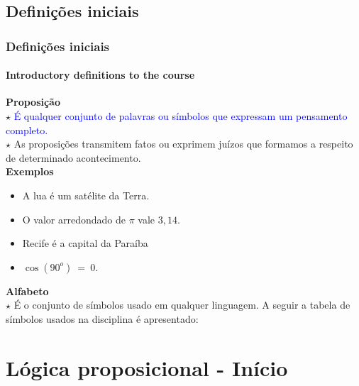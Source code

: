 \documentclass[10pt, headsepline, captions=tableabove,xcolor=table]{beamer}
\begin{document}
\subsection{Definições iniciais}
%
\begin{frame}[t]
    \frametitle{Definições iniciais}
    \framesubtitle{Introductory definitions to the course}
    \textbf{Proposição}\\
    \quad $\star$ \textcolor{blue}{É qualquer conjunto de palavras ou símbolos que expressam um pensamento completo.}\\
    \quad $\star$ As proposições transmitem fatos ou exprimem juízos que formamos a respeito de determinado acontecimento.\\ \pause
    \textbf{Exemplos}
    \begin{itemize}
        \item A lua é um satélite da Terra.\pause
        \item O valor arredondado de $\pi$ vale $3,14$.\pause
        \item Recife é a capital da Paraíba\pause
        \item $\cos(90^o)~=~0$.\pause
    \end{itemize}
    \textbf{Alfabeto}\\
    \quad $\star$ É o conjunto de símbolos usado em qualquer linguagem. A seguir a tabela de símbolos usados na disciplina é apresentado:
\end{frame}
%
\section{Lógica proposicional - Início}
%
\end{document}
